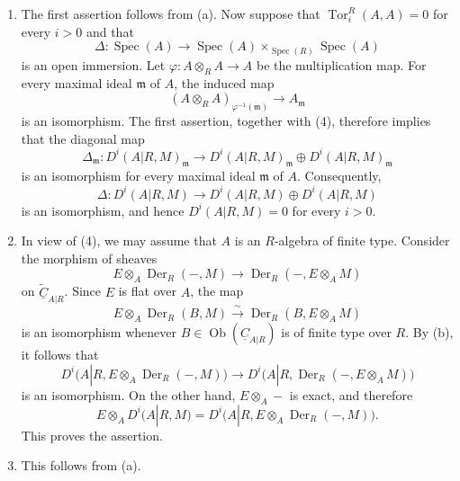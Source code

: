 \begin{enumerate}[label=(\arabic*)]
\item The first assertion follows from (a). Now suppose that
$\operatorname{Tor}_i^R(A,A)=0$ for every $i>0$ and that
\[
 \Delta:\operatorname{Spec}(A)\longrightarrow
 \operatorname{Spec}(A)\times_{\operatorname{Spec}(R)}
 \operatorname{Spec}(A)
\]
is an open immersion. Let
$\varphi:A\otimes_RA\longrightarrow A$ be the multiplication map.
For every maximal ideal $\mathfrak m$ of $A$, the induced map
\[
 (A\otimes_RA)_{\varphi^{-1}(\mathfrak m)}
 \longrightarrow A_{\mathfrak m}
\]
is an isomorphism. The first assertion, together with (4),
therefore implies that the diagonal map
\[
 \Delta_{\mathfrak m}:D^i(A|R,M)_{\mathfrak m}
 \longrightarrow D^i(A|R,M)_{\mathfrak m}
 \oplus D^i(A|R,M)_{\mathfrak m}
\]
is an isomorphism for every maximal ideal $\mathfrak m$ of $A$.
Consequently,
\[
 \Delta:D^i(A|R,M)\longrightarrow
 D^i(A|R,M)\oplus D^i(A|R,M)
\]
is an isomorphism, and hence $D^i(A|R,M)=0$ for every $i>0$.

\item In view of (4), we may assume that $A$ is an
$R$-algebra of finite type. Consider the morphism of sheaves
\[
 E\otimes_A\operatorname{Der}_R(-,M)
 \longrightarrow
 \operatorname{Der}_R(-,E\otimes_AM)
\]
on $\widetilde{\underline C}_{A|R}$. Since $E$ is flat over $A$,
the map
\[
 E\otimes_A\operatorname{Der}_R(B,M)
 \xrightarrow{\ \sim\ }
 \operatorname{Der}_R(B,E\otimes_AM)
\]
is an isomorphism whenever
$B\in\operatorname{Ob}(\underline C_{A|R})$ is of finite type
over $R$. By (b), it follows that
\[
 D^i\bigl(A|R,E\otimes_A\operatorname{Der}_R(-,M)\bigr)
 \longrightarrow
 D^i\bigl(A|R,\operatorname{Der}_R(-,E\otimes_AM)\bigr)
\]
is an isomorphism. On the other hand,
$E\otimes_A-$ is exact, and therefore
\[
 E\otimes_AD^i(A|R,M)
 =D^i\bigl(A|R,E\otimes_A\operatorname{Der}_R(-,M)\bigr).
\]
This proves the assertion.

\item This follows from (a).



\end{enumerate}
